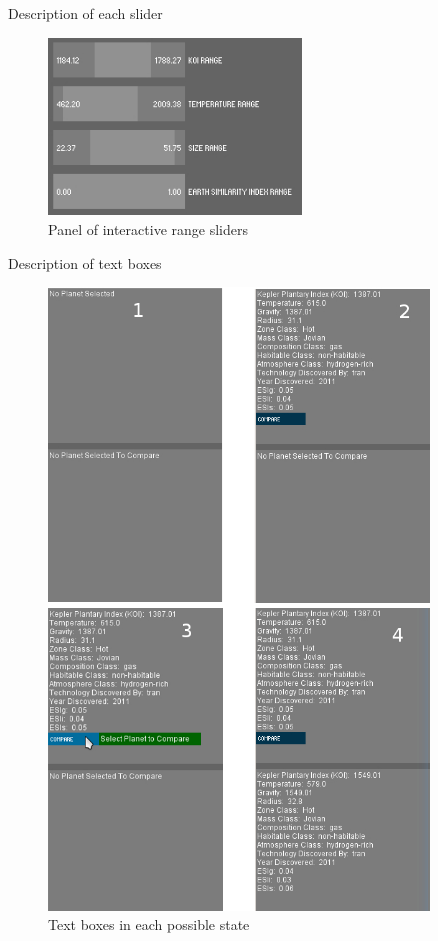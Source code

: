 Description of each slider
\begin{figure}[H]
  \centering
      \includegraphics[width=0.6\textwidth]{images/sliders.jpg}
  \caption{Panel of interactive range sliders}
  \label{fig:sliders}
\end{figure}
Description of text boxes
\begin{figure}[H]
  \centering
      \includegraphics[width=0.9\textwidth]{images/textBoxes.jpg}
  \caption{Text boxes in each possible state}
  \label{fig:sliders}
\end{figure}
